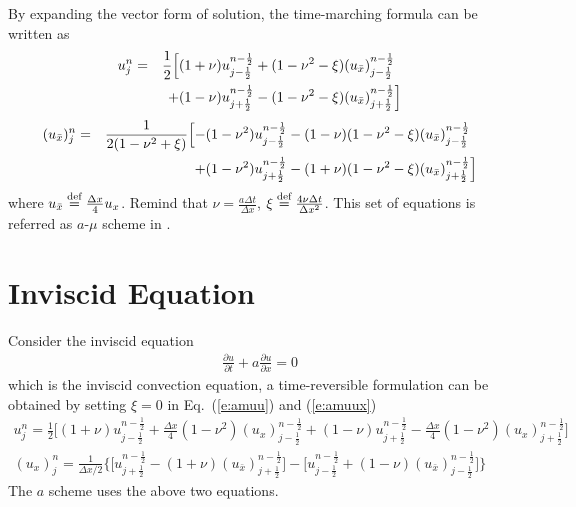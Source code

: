 \documentclass{turgon}
\begin{document}
By expanding the vector form of solution, the time-marching formula can be
written as
\begin{alignat}{2}
  u_j^n &= &\frac{1}{2}\Big[
    &(1+\nu)u_{j-\frac{1}{2}}^{n-\frac{1}{2}}
    + (1-\nu^2-\xi)(u_{\bar{x}})_{j-\frac{1}{2}}^{n-\frac{1}{2}}
    \notag \\
  &&+ &(1-\nu)u_{j+\frac{1}{2}}^{n-\frac{1}{2}}
    - (1-\nu^2-\xi)(u_{\bar{x}})_{j+\frac{1}{2}}^{n-\frac{1}{2}}
           \Big] \label{e:amuu}
\end{alignat}
\begin{alignat}{2}
  (u_{\bar{x}})_j^n &= &\frac{1}{2(1-\nu^2+\xi)}\Big[
    -& (1-\nu^2)u_{j-\frac{1}{2}}^{n-\frac{1}{2}}
    -  (1-\nu)(1-\nu^2-\xi)(u_{\bar{x}})_{j-\frac{1}{2}}^{n-\frac{1}{2}}
    \notag \\
  &&+& (1-\nu^2)u_{j+\frac{1}{2}}^{n-\frac{1}{2}}
    -  (1+\nu)(1-\nu^2-\xi)(u_{\bar{x}})_{j+\frac{1}{2}}^{n-\frac{1}{2}}
                       \Big] \label{e:amuux}
\end{alignat}
where $u_{\bar{x}} \defeq \frac{\Delta x}{4}u_x$.  Remind that $\nu =
\frac{a\Delta t}{\Delta x}$, $\xi \defeq \frac{4\nu\Delta t}{\Delta x^2}$.
This set of equations is referred as $a$-$\mu$ scheme in
\citep{chang_method_1995}.

\section{Inviscid Equation}
\label{s:inviscid_model}

Consider the inviscid equation
\begin{align}
  \frac{\partial u}{\partial t} + a\frac{\partial u}{\partial x} = 0
  \label{e:conv_govern}
\end{align}
which is the inviscid convection equation, a time-reversible formulation can be
obtained by setting $\xi=0$ in Eq.~(\ref{e:amuu}) and (\ref{e:amuux})
\begin{gather}
  u_j^n = \frac{1}{2}\Big[
      (1+\nu)u_{j-\frac{1}{2}}^{n-\frac{1}{2}}
    + \frac{\Delta x}{4}(1-\nu^2)(u_x)_{j-\frac{1}{2}}^{n-\frac{1}{2}}
    + (1-\nu)u_{j+\frac{1}{2}}^{n-\frac{1}{2}}
    - \frac{\Delta x}{4}(1-\nu^2)(u_x)_{j+\frac{1}{2}}^{n-\frac{1}{2}}
  \Big] \label{e:au} \\
  (u_x)_j^n = \frac{1}{\Delta x/2}\Big\{
      \Big[ u_{j+\frac{1}{2}}^{n-\frac{1}{2}}
         - (1+\nu)(u_{\bar{x}})_{j+\frac{1}{2}}^{n-\frac{1}{2}} \Big]
    - \Big[ u_{j-\frac{1}{2}}^{n-\frac{1}{2}}
         + (1-\nu)(u_{\bar{x}})_{j-\frac{1}{2}}^{n-\frac{1}{2}} \Big]
  \Big\} \label{e:aux}
\end{gather}
The $a$ scheme uses the above two equations.
\end{document}
